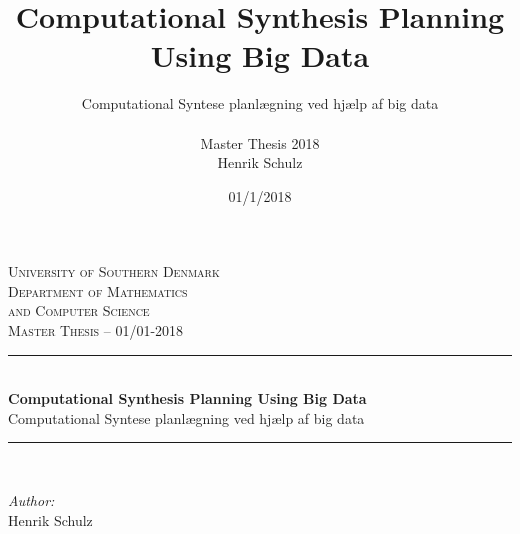 \documentclass[a4paper,10pt,titlepage]{paper}
\title{Computational Synthesis Planning Using Big Data}
\author{Computational Syntese planlægning ved hjælp af big data\\ \\Master Thesis 2018\\Henrik Schulz}
\date{01/1/2018}
\begin{document}
\begin{titlepage}

\newcommand{\HRule}{\rule{\linewidth}{0.5mm}} %

\center %

\textsc{\LARGE University of Southern Denmark\\\vspace{0.2cm}Department of Mathematics \\ \vspace{0.2 cm} and Computer Science}\\[1.5cm] %
\textsc{\large Master Thesis -- 01/01-2018}\\[0.5cm] %

\HRule \\[0.4cm]
{\huge \bfseries Computational Synthesis Planning Using Big Data}\\[0.4cm] 
{Computational Syntese planlægning ved hjælp af big data}
\HRule \\[1.5cm]

\begin{minipage}{0.3\textwidth}
\begin{flushleft} \large
\emph{Author:}\\
Henrik Schulz\\


\end{flushleft}
\end{minipage}
\end{titlepage}
\end{document}
